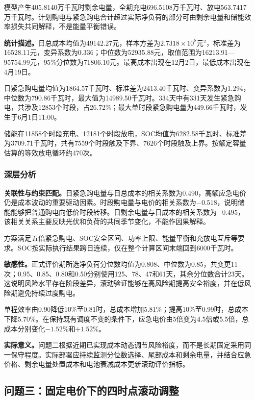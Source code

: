 \documentclass[UTF8,a4paper,12pt,fontset=fandol]{ctexart}
\numberwithin{equation}{section}
\begin{document}
模型产生405.8140万千瓦时剩余电量，全期充电696.5108万千瓦时、放电563.7417万千瓦时。计划购电与紧急购电合计超过实际净负荷的部分可由剩余电量和储能效率损失共同解释，不是能量平衡错误。

\textbf{统计描述。}日总成本均值为49142.27元，样本方差为$2.7318\times10^8$元$^2$，标准差为16528.11元，变异系数为0.336；中位数为52935.88元，取值范围为16213.91---95754.99元，95\%分位数为71806.10元。最高成本出现在12月2日，最低成本出现在4月19日。

日紧急购电量均值为1864.57千瓦时、标准差为2413.40千瓦时、变异系数为1.294，中位数为790.86千瓦时，最大值为14989.50千瓦时。334天中有331天发生紧急购电，共涉及12853个时段，占26.72\%；最大单时段紧急购电量为449.66千瓦时，发生于6月1日11:00。

储能在11858个时段充电、12181个时段放电，SOC均值为6282.58千瓦时、标准差为3709.71千瓦时，共有7559个时段触及下界、7626个时段触及上界。按额定容量估算的等效放电循环约470次。

\subsubsection{深层分析}

\textbf{关联性与约束匹配。}日紧急购电量与日总成本的相关系数为0.490，高额应急电价仍是成本波动的重要驱动因素。时段购电量与电价的相关系数为$-0.518$，说明储能能够把普通购电向低价时段转移。日剩余电量与日成本的相关系数为$-0.495$，该相关关系主要反映光伏和负荷的共同季节变化，不能作因果解释。

方案满足五倍紧急购电、SOC安全区间、功率上限、能量平衡和充放电互斥等要求。SOC按实际执行结果跨日连续，仅在整个计算区间末端回到6000千瓦时。

\textbf{敏感性。}正式评价期所选净负荷分位数均值为0.808、中位数为0.85，共变更11次；0.95、0.85、0.80和0.50分别使用125、78、47和61天，其余分位数合计23天。这说明风险水平存在阶段差异，滚动验证能够在高风险期提高安全裕度，并在低风险期避免持续过度购电。

单程效率由0.90降低10\%至0.81时，总成本增加5.81\%；提高10\%至0.99时，总成本下降5.70\%。在保持既有调度不变的条件下，应急电价由5倍变为4.5倍或5.5倍，总成本分别变化$-1.52\%$和$+1.52\%$。

\textbf{实际意义。}问题二根据近期已实现成本动态调节风险裕度，而不是长期固定采用同一保守程度。实际部署应持续监测分位数选择、尾部成本和剩余电量，并结合应急价格、剩余电量处置成本和电池衰减成本更新滚动评价指标。

\subsection{问题三：固定电价下的四时点滚动调整}
\end{document}
